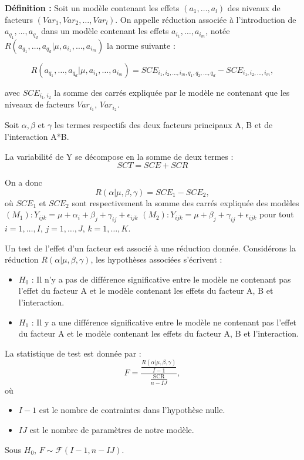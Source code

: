 \documentclass[12pt,a4paper]{article}
\begin{document}
	\textbf{Définition :} Soit un modèle contenant les effets $(a_1,\ldots,a_l)$ des niveaux de facteurs $(Var_1, Var_2, \ldots, Var_l)$. On appelle réduction associée à l'introduction de $a_{q_1}, \ldots, a_{q_d}$ dans un modèle contenant les effets $a_{i_1}, \ldots, a_{i_m}$, notée $R(a_{q_1}, \ldots, a_{q_d}|\mu,a_{i_1}, \ldots, a_{i_m})$ la norme suivante : 
	
	\begin{equation}
		R(a_{q_1}, \ldots, a_{q_d}|\mu,a_{i_1}, \ldots, a_{i_m}) = SCE_{i_1,i_2,\ldots,i_m,q_1,q_2,\ldots,q_d} - SCE_{i_1,i_2,\ldots,i_m},
	\end{equation}
	
	avec $SCE_{i_1,i_2}$ la somme des carrés expliquée par le modèle ne contenant que les niveaux de facteurs $Var_{i_1}$, $Var_{i_2}$.
	
	Soit $\alpha, \beta$ et $\gamma$ les termes respectifs des deux facteurs principaux A, B et de l'interaction A*B.
	
	La variabilité de Y se décompose en la somme de deux termes : 
	\begin{equation}
		SCT = SCE + SCR
	\end{equation}
	
	On a donc
	\begin{equation}
		R(\alpha|\mu,\beta,\gamma) = SCE_1 - SCE_2,
	\end{equation}
	où $SCE_1$ et $SCE_2$ sont respectivement la somme des carrés expliquée des modèles
	$(M_1) : Y_{ijk} = \mu + \alpha_i + \beta_j + \gamma_{ij} + \epsilon_{ijk}$
	$(M_2) : Y_{ijk} = \mu + \beta_j + \gamma_{ij} + \epsilon_{ijk}$
	pour tout $i = 1,\ldots,I$, $j = 1,\ldots,J$, $k = 1,\ldots,K$.
	
	Un test de l'effet d'un facteur est associé à une réduction donnée. Considérons la réduction $R(\alpha|\mu,\beta,\gamma)$, les hypothèses associées s'écrivent : 
	\begin{itemize}
		\item $H_0$ : Il n'y a pas de différence significative entre le modèle ne contenant pas l'effet du facteur A et le modèle contenant les effets du facteur A, B et l'interaction.
		\item $H_1$ : Il y a une différence significative entre le modèle ne contenant pas l'effet du facteur A et le modèle contenant les effets du facteur A, B et l'interaction.
	\end{itemize}
	La statistique de test est donnée par : 
	\begin{equation}
		F = \frac{\frac{R(\alpha|\mu,\beta,\gamma)}{I-1}}{\frac{\text{SCR}}{n-IJ}},
	\end{equation}
	où 
	\begin{itemize}
		\item $I-1$ est le nombre de contraintes dans l'hypothèse nulle.
		\item $IJ$ est le nombre de paramètres de notre modèle.
	\end{itemize}
	Sous $H_0$, $F \sim \mathcal{F}(I-1, n-IJ).$
	
\end{document}
